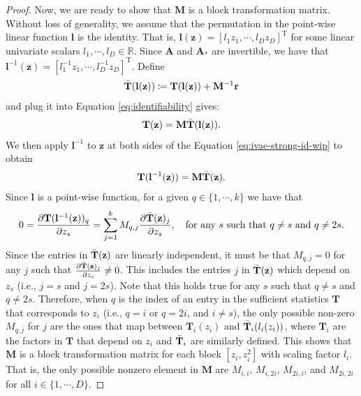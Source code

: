 \documentclass[nohyperref]{article}
\theoremstyle{plain}
\theoremstyle{definition}
\theoremstyle{remark}
\begin{document}
\begin{proof}
    Now, we are ready to show that $\mathbf{M}$ is a block transformation matrix. Without loss of generality, we assume that the permutation in the point-wise linear function $\mathbf{l}$ is the identity. That is, $\mathbf{l}(\mathbf{z})=[l_1 z_1,\cdots,l_D z_D]^{\text{T}}$ for some linear univariate scalars $l_1,\cdots,l_D\in\mathbb{R}$. Since $\mathbf{A}$ and $\mathbf{A}_{*}$ are invertible, we have that $\mathbf{l}^{-1}(\mathbf{z})=[l_1^{-1} z_1,\cdots,l_D^{-1} z_D]^{\text{T}}$. Define
    \begin{align}
        \Bar{\mathbf{T}}(\mathbf{l}(\mathbf{z}))\coloneqq\mathbf{T}(\mathbf{l}(\mathbf{z}))+\mathbf{M}^{-1}\mathbf{r}
    \end{align}
    and plug it into Equation \eqref{eq:identifiability} gives:
    \begin{align}
        \mathbf{T}(\mathbf{z})=\mathbf{M}\Bar{\mathbf{T}}(\mathbf{l}(\mathbf{z})).\label{eq:ivae-strong-id-wip}
    \end{align}
    We then apply $\mathbf{l}^{-1}$ to $\mathbf{z}$ at both sides of the Equation \eqref{eq:ivae-strong-id-wip} to obtain
    \begin{align}
        \mathbf{T}(\mathbf{l}^{-1}(\mathbf{z}))=\mathbf{M}\Bar{\mathbf{T}}(\mathbf{z}).
    \end{align}
    Since $\mathbf{l}$ is a point-wise function, for a given $q\in\{1,\cdots,k\}$ we have that 
    \begin{align}\label{eq:proof_perm}
        0 = \frac{\partial \mathbf{T}(\mathbf{l}^{-1}(\mathbf{z}))_q}{\partial z_s}=\sum_{j=1}^k M_{q,j}\frac{\partial \Bar{\mathbf{T}}(\mathbf{z})_j}{\partial z_s},\quad\text{for any $s$ such that $q\not=s$ and $q\not=2s$}.
    \end{align}
    Since the entries in $\Bar{\mathbf{T}}(\mathbf{z})$ are linearly independent, it must be that $M_{q,j}=0$ for any $j$ such that $\frac{\partial \Bar{\mathbf{T}}(\mathbf{z})_j}{\partial z_s}\not=0$. This includes the entries $j$ in $\Bar{\mathbf{T}}(\mathbf{z})$ which depend on $z_s$ (i.e., $j=s$ and $j=2s$). Note that this holds true for any $s$ such that $q\not=s$ and $q\not=2s$. Therefore, when $q$ is the index of an entry in the sufficient statistics $\mathbf{T}$ that corresponds to $z_i$ (i.e., $q=i$ or $q=2i$, and $i\not=s$), the only possible non-zero $M_{q,j}$ for $j$ are the ones that map between $\mathbf{T}_i(z_i)$ and $\Bar{\mathbf{T}}_i(l_i(z_i))$, where $\mathbf{T}_i$ are the factors in $\mathbf{T}$ that depend on $z_i$ and $\Bar{\mathbf{T}}_i$ are similarly defined. This shows that $\mathbf{M}$ is a block transformation matrix for each block $[z_i,z_i^2]$ with scaling factor $l_i$. That is, the only possible nonzero element in $\mathbf{M}$ are $M_{i,i}$, $M_{i,2i}$, $M_{2i,i}$, and $M_{2i,2i}$ for all $i\in\{1,\cdots,D\}$.
    

\end{proof}
\end{document}

